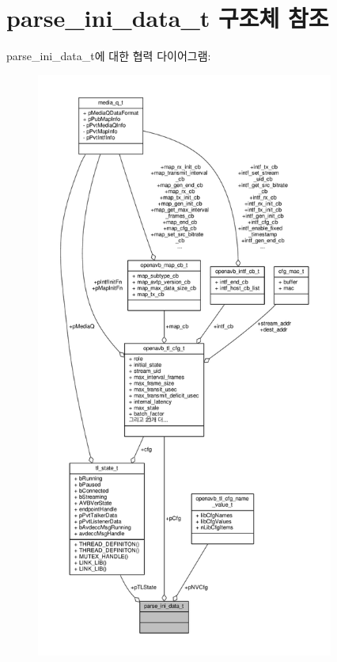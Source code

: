\hypertarget{structparse__ini__data__t}{}\section{parse\+\_\+ini\+\_\+data\+\_\+t 구조체 참조}
\label{structparse__ini__data__t}


parse\+\_\+ini\+\_\+data\+\_\+t에 대한 협력 다이어그램\+:
\nopagebreak
\begin{figure}[H]
\begin{center}
\leavevmode
\includegraphics[height=550pt]{structparse__ini__data__t__coll__graph}
\end{center}
\end{figure}
